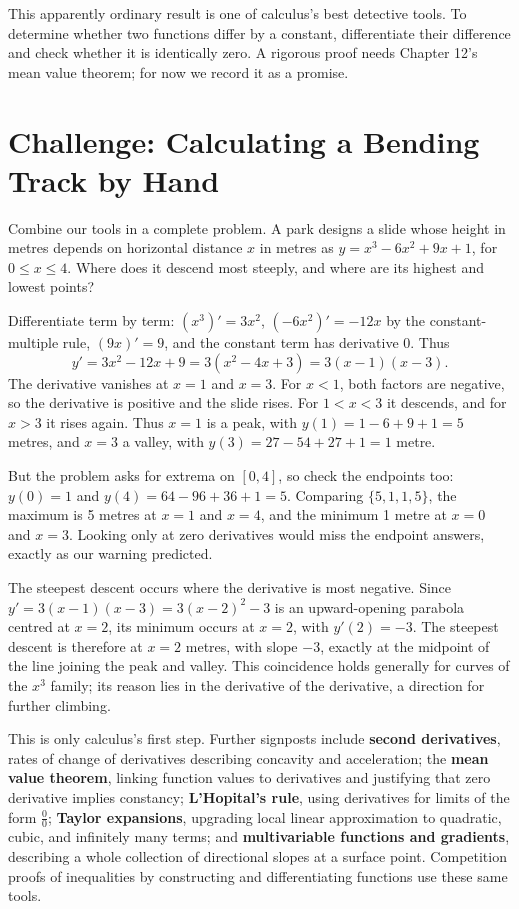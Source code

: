 This apparently ordinary result is one of calculus's best detective tools. To determine whether two functions differ by a constant, differentiate their difference and check whether it is identically zero. A rigorous proof needs Chapter 12's mean value theorem; for now we record it as a promise.

\section{Challenge: Calculating a Bending Track by Hand}

Combine our tools in a complete problem. A park designs a slide whose height in metres depends on horizontal distance $x$ in metres as $y=x^3-6x^2+9x+1$, for $0\le x\le 4$. Where does it descend most steeply, and where are its highest and lowest points?

Differentiate term by term: $(x^3)'=3x^2$, $(-6x^2)'=-12x$ by the constant-multiple rule, $(9x)'=9$, and the constant term has derivative 0. Thus
\[
y'=3x^2-12x+9=3(x^2-4x+3)=3(x-1)(x-3).
\]
The derivative vanishes at $x=1$ and $x=3$. For $x<1$, both factors are negative, so the derivative is positive and the slide rises. For $1<x<3$ it descends, and for $x>3$ it rises again. Thus $x=1$ is a peak, with $y(1)=1-6+9+1=5$ metres, and $x=3$ a valley, with $y(3)=27-54+27+1=1$ metre.

But the problem asks for extrema on $[0,4]$, so check the endpoints too: $y(0)=1$ and $y(4)=64-96+36+1=5$. Comparing $\{5,1,1,5\}$, the maximum is 5 metres at $x=1$ and $x=4$, and the minimum 1 metre at $x=0$ and $x=3$. Looking only at zero derivatives would miss the endpoint answers, exactly as our warning predicted.

The steepest descent occurs where the derivative is most negative. Since $y'=3(x-1)(x-3)=3(x-2)^2-3$ is an upward-opening parabola centred at $x=2$, its minimum occurs at $x=2$, with $y'(2)=-3$. The steepest descent is therefore at $x=2$ metres, with slope $-3$, exactly at the midpoint of the line joining the peak and valley. This coincidence holds generally for curves of the $x^3$ family; its reason lies in the derivative of the derivative, a direction for further climbing.

\begin{pandeng}
This is only calculus's first step. Further signposts include \textbf{second derivatives}, rates of change of derivatives describing concavity and acceleration; the \textbf{mean value theorem}, linking function values to derivatives and justifying that zero derivative implies constancy; \textbf{L'Hopital's rule}, using derivatives for limits of the form $\frac{0}{0}$; \textbf{Taylor expansions}, upgrading local linear approximation to quadratic, cubic, and infinitely many terms; and \textbf{multivariable functions and gradients}, describing a whole collection of directional slopes at a surface point. Competition proofs of inequalities by constructing and differentiating functions use these same tools.
\end{pandeng}

